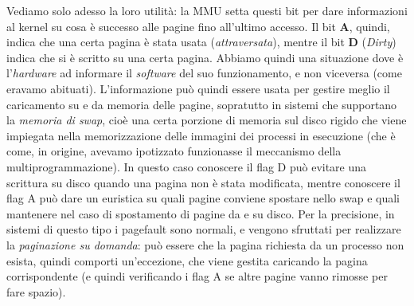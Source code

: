\documentclass[a4paper,11pt]{article}
\begin{document}
\begin{itemize}
\begin{itemize}
		Vediamo solo adesso la loro utilità: la MMU setta questi bit per dare informazioni al kernel su cosa è successo alle pagine fino all'ultimo accesso.
		Il bit \textbf{A}, quindi, indica che una certa pagina è stata usata (\textit{attraversata}), mentre il bit \textbf{D} (\textit{Dirty}) indica che si è scritto su una certa pagina. 
		Abbiamo quindi una situazione dove è l'\textit{hardware} ad informare il \textit{software} del suo funzionamento, e non viceversa (come eravamo abituati). 
		L'informazione può quindi essere usata per gestire meglio il caricamento su e da memoria delle pagine, sopratutto in sistemi che supportano la \textit{memoria di swap}, cioè una certa porzione di memoria sul disco rigido che viene impiegata nella memorizzazione delle immagini dei processi in esecuzione (che è come, in origine, avevamo ipotizzato funzionasse il meccanismo della multiprogrammazione).
		In questo caso conoscere il flag D può evitare una scrittura su disco quando una pagina non è stata modificata, mentre conoscere il flag A può dare un euristica su quali pagine conviene spostare nello swap e quali mantenere nel caso di spostamento di pagine da e su disco.
		Per la precisione, in sistemi di questo tipo i pagefault sono normali, e vengono sfruttati per realizzare la \textit{paginazione su domanda}: può essere che la pagina richiesta da un processo non esista, quindi comporti un'eccezione, che viene gestita caricando la pagina corrispondente (e quindi verificando i flag A se altre pagine vanno rimosse per fare spazio).
\end{itemize}


\end{itemize}
\end{document}
